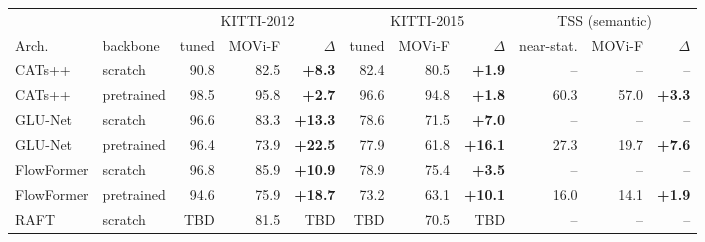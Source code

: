 \begin{tabular}{ll rrr rrr rrr}
\toprule
 & & \multicolumn{3}{c}{KITTI-2012} & \multicolumn{3}{c}{KITTI-2015} & \multicolumn{3}{c}{TSS (semantic)} \\
\cmidrule(lr){3-5}\cmidrule(lr){6-8}\cmidrule(lr){9-11}
Arch. & backbone & tuned & MOVi-F & $\Delta$ & tuned & MOVi-F & $\Delta$ & near-stat. & MOVi-F & $\Delta$ \\
\midrule
CATs++  & scratch     & 90.8 & 82.5 & \textbf{+8.3}  & 82.4 & 80.5 & \textbf{+1.9}  & -- & -- & -- \\
CATs++  & pretrained  & 98.5 & 95.8 & \textbf{+2.7}  & 96.6 & 94.8 & \textbf{+1.8}  & 60.3 & 57.0 & \textbf{+3.3} \\
\midrule
GLU-Net & scratch     & 96.6 & 83.3 & \textbf{+13.3} & 78.6 & 71.5 & \textbf{+7.0}  & -- & -- & -- \\
GLU-Net & pretrained  & 96.4 & 73.9 & \textbf{+22.5} & 77.9 & 61.8 & \textbf{+16.1} & 27.3 & 19.7 & \textbf{+7.6} \\
\midrule
FlowFormer & scratch    & 96.8 & 85.9 & \textbf{+10.9} & 78.9 & 75.4 & \textbf{+3.5}  & -- & -- & -- \\
FlowFormer & pretrained & 94.6 & 75.9 & \textbf{+18.7} & 73.2 & 63.1 & \textbf{+10.1} & 16.0 & 14.1 & \textbf{+1.9} \\
\midrule
RAFT       & scratch     & TBD & 81.5 & TBD & TBD & 70.5 & TBD & -- & -- & -- \\
\bottomrule
\end{tabular}
